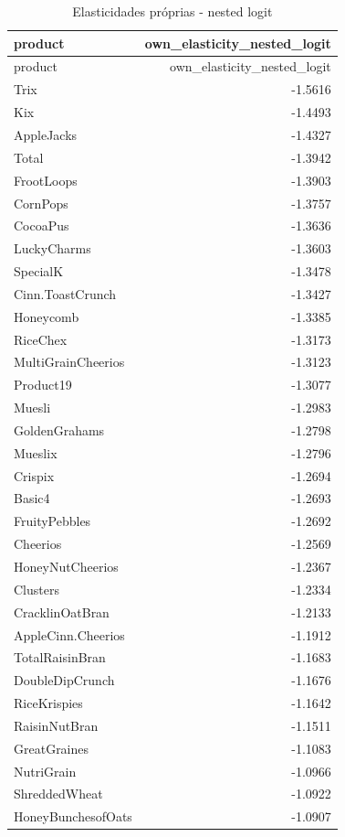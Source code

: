 \begingroup
\scriptsize
\begin{longtable}{@{}lr@{}}
\caption{Elasticidades próprias - nested logit}\label{tab:own-elas-nested}\\
\toprule
product & own\_elasticity\_nested\_logit \\
\midrule
\endfirsthead
\toprule
product & own\_elasticity\_nested\_logit \\
\midrule
\endhead
Trix & -1.5616 \\
Kix & -1.4493 \\
AppleJacks & -1.4327 \\
Total & -1.3942 \\
FrootLoops & -1.3903 \\
CornPops & -1.3757 \\
CocoaPus & -1.3636 \\
LuckyCharms & -1.3603 \\
SpecialK & -1.3478 \\
Cinn.ToastCrunch & -1.3427 \\
Honeycomb & -1.3385 \\
RiceChex & -1.3173 \\
MultiGrainCheerios & -1.3123 \\
Product19 & -1.3077 \\
Muesli & -1.2983 \\
GoldenGrahams & -1.2798 \\
Mueslix & -1.2796 \\
Crispix & -1.2694 \\
Basic4 & -1.2693 \\
FruityPebbles & -1.2692 \\
Cheerios & -1.2569 \\
HoneyNutCheerios & -1.2367 \\
Clusters & -1.2334 \\
CracklinOatBran & -1.2133 \\
AppleCinn.Cheerios & -1.1912 \\
TotalRaisinBran & -1.1683 \\
DoubleDipCrunch & -1.1676 \\
RiceKrispies & -1.1642 \\
RaisinNutBran & -1.1511 \\
GreatGraines & -1.1083 \\
NutriGrain & -1.0966 \\
ShreddedWheat & -1.0922 \\
HoneyBunchesofOats & -1.0907 \\

\end{longtable}
